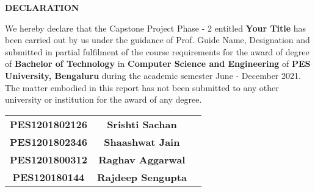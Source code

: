 \begin{titlepage}
\centerline{\huge{\textbf{DECLARATION}}}

\vspace{1cm}
\normalsize

\noindent We hereby declare that the Capstone Project Phase - 2 entitled \textbf{Your Title} has been carried out by us under the guidance of Prof. Guide Name, Designation and submitted in partial fulfilment of the course requirements for the award of degree of \textbf{Bachelor of Technology} in \textbf{Computer Science and Engineering} of \textbf{PES University, Bengaluru} during the academic semester June - December 2021. The matter embodied in this report has not been submitted to any other university or institution for the award of any degree.\\


\begin{table}[H]
\begin{flushright}
\renewcommand{\arraystretch}{2.5}
  \begin{tabular}{ccp{3cm}}


      \textbf{PES1201802126} & \textbf{Srishti Sachan} &  \\
      \textbf{PES1201802346} & \textbf{Shaashwat Jain} &  \\
      \textbf{PES1201800312} & \textbf{Raghav Aggarwal} &  \\
      \textbf{PES120180144} & \textbf{Rajdeep Sengupta} &  \\

  \end{tabular}
\end{flushright}
\end{table}



\end{titlepage}